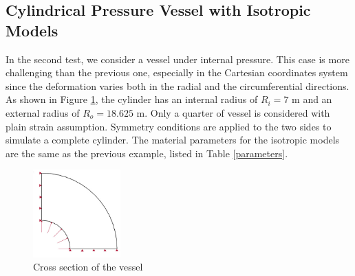 \subsection{Cylindrical Pressure Vessel with Isotropic Models}
\label{pressure_vessel}
In the second test, we consider a vessel under internal pressure. This case is more challenging than the previous one, especially in the Cartesian coordinates system since the deformation varies both in the radial and the circumferential directions. As shown in Figure \ref{fig:vessel_schematic}, the cylinder has an internal radius of $R_i = 7$ m and an external radius of $R_o = 18.625$ m. Only a quarter of vessel is considered with plain strain assumption. Symmetry conditions are applied to the two sides to simulate a complete cylinder. The material parameters for the isotropic models are the same as the previous example, listed in Table \ref{parameters}. 
\begin{figure}[H]
	\centering
	\includegraphics[width=0.3\textwidth]{./figures/vessel_schematic.jpg}
	\caption{Cross section of the vessel}
	\label{fig:vessel_schematic}
\end{figure}

